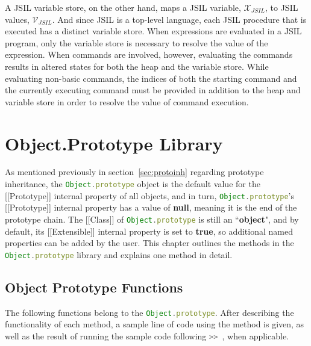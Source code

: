 \documentclass[a4paper,11pt,twoside]{report}
\def\jsinline{\lstinline[language=JavaScript, basicstyle=\small]}%\end{lstlisting}
\begin{document}
A JSIL variable store, on the other hand, maps a JSIL variable, $\mathcal{X}_{JSIL}$, to JSIL values, $\mathcal{V}_{JSIL}$. And since JSIL is a top-level language, each JSIL procedure that is executed has a distinct variable store. When expressions are evaluated in a JSIL program, only the variable store is necessary to resolve the value of the expression. When commands are involved, however, evaluating the commands results in altered states for both the heap and the variable store. While evaluating non-basic commands, the indices of both the starting command and the currently executing command must be provided in addition to the heap and variable store in order to resolve the value of command execution.

\chapter{Object.Prototype Library}
As mentioned previously in section~\ref{sec:protoinh} regarding prototype inheritance, the \jsinline|Object.prototype| object is the default value for the [[Prototype]] internal property of all objects, and in turn, \jsinline|Object.prototype|'s [[Prototype]] internal property has a value of \textbf{null}, meaning it is the end of the prototype chain. The [[Class]] of \jsinline|Object.prototype| is still an ``\textbf{object}", and by default, its [[Extensible]] internal property is set to \textbf{true}, so additional named properties can be added by the user. This chapter outlines the methods in the \jsinline|Object.prototype| library and explains one method in detail.

\section{Object Prototype Functions}
The following functions belong to the \jsinline|Object.prototype|. After describing the functionality of each method, a sample line of code using the method is given, as well as the result of running the sample code following \jsinline|>> |, when applicable.
\end{document}
